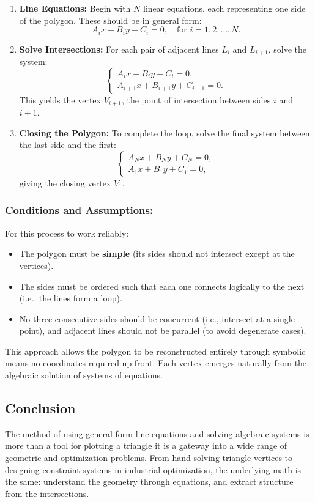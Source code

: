 \documentclass[10pt,twocolumn]{article}
\begin{document}
\begin{enumerate}
    \item \textbf{Line Equations:} Begin with \(N\) linear equations, each representing one side of the polygon. These should be in general form:
    \[
    A_i x + B_i y + C_i = 0, \quad \text{for } i = 1, 2, \dots, N.
    \]

    \item \textbf{Solve Intersections:} For each pair of adjacent lines \(L_i\) and \(L_{i+1}\), solve the system:
    \[
    \begin{cases}
    A_i x + B_i y + C_i = 0, \\
    A_{i+1} x + B_{i+1} y + C_{i+1} = 0.
    \end{cases}
    \]
    This yields the vertex \(V_{i+1}\), the point of intersection between sides \(i\) and \(i+1\).

    \item \textbf{Closing the Polygon:} To complete the loop, solve the final system between the last side and the first:
    \[
    \begin{cases}
    A_N x + B_N y + C_N = 0, \\
    A_1 x + B_1 y + C_1 = 0,
    \end{cases}
    \]
    giving the closing vertex \(V_1\).
\end{enumerate}

\subsubsection*{Conditions and Assumptions:}

For this process to work reliably:

\begin{itemize}
    \item The polygon must be \textbf{simple} (its sides should not intersect except at the vertices).
    \item The sides must be ordered such that each one connects logically to the next (i.e., the lines form a loop).
    \item No three consecutive sides should be concurrent (i.e., intersect at a single point), and adjacent lines should not be parallel (to avoid degenerate cases).
\end{itemize}

This approach allows the polygon to be reconstructed entirely through symbolic means no coordinates required up front. Each vertex emerges naturally from the algebraic solution of systems of equations.

\subsection{Conclusion}
The method of using general form line equations and solving algebraic systems is more than a tool for plotting a triangle it is a gateway into a wide range of geometric and optimization problems. From hand solving triangle vertices to designing constraint systems in industrial optimization, the underlying math is the same: understand the geometry through equations, and extract structure from the intersections.
\end{document}
